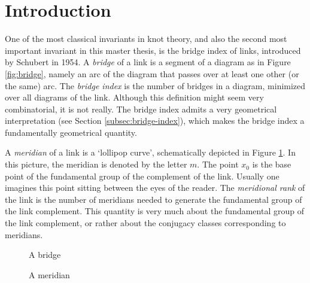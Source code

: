 \documentclass[main.tex]{subfiles}
\begin{document}
\section*{Introduction}
One of the most classical invariants in knot theory, and also the second most important invariant in this master thesis, is the bridge index of links, introduced by Schubert \cite{schubert1954} in 1954. A \textit{bridge} of a link is a segment of a diagram as in Figure \ref{fig:bridge}, namely an arc of the diagram that passes over at least one other (or the same) arc. The \textit{bridge index} is the number of bridges in a diagram, minimized over all diagrams of the link. Although this definition might seem very combinatorial, it is not really. The bridge index admits a very geometrical interpretation (see Section \ref{subsec:bridge-index}), which makes the bridge index a fundamentally geometrical quantity.

A \textit{meridian} of a link is a `lollipop curve', schematically depicted in Figure \ref{fig:meridian}. In this picture, the meridian is denoted by the letter $m$. The point $x_0$ is the base point of the fundamental group of the complement of the link. Usually one imagines this point sitting between the eyes of the reader. The \textit{meridional rank} of the link is the number of meridians needed to generate the fundamental group of the link complement. This quantity is very much about the fundamental group of the link complement, or rather about the conjugacy classes corresponding to meridians.

\begin{figure}[htb]
\centering
\begin{minipage}{0.5\textwidth}
\centering
{}
\caption{A bridge}
\label{fig:bridge}
\end{minipage}%
\begin{minipage}{0.5\textwidth}
\centering
{}
\caption{A meridian}
\label{fig:meridian}
\end{minipage}
\end{figure}
\end{document}
